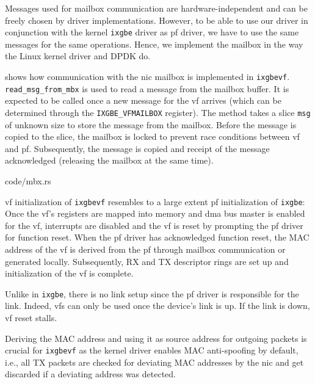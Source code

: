 Messages used for mailbox communication are hardware-independent and can be
freely chosen by driver implementations. However, to be able to use our driver
in conjunction with the kernel \texttt{ixgbe} driver as \ac{pf} driver, we have
to use the same messages for the same operations. Hence, we implement the
mailbox in the way the Linux kernel driver and DPDK do.

 shows how communication with the \ac{nic} mailbox is implemented
in \texttt{ixgbevf}. \linebreak \texttt{read\_msg\_from\_mbx} is used to read a
message from the mailbox buffer. It is expected to be called once a new message
for the \ac{vf} arrives (which can be determined through the
\texttt{IXGBE\_VFMAILBOX} register). The method takes a slice \texttt{msg} of
unknown size to store the message from the mailbox. Before the message is copied
to the slice, the mailbox is locked to prevent race conditions between \ac{vf}
and \ac{pf}. Subsequently, the message is copied and receipt of the message
acknowledged (releasing the mailbox at the same time).

\begin{minipage}{\textwidth}
     {code/mbx.rs}
\end{minipage}

\ac{vf} initialization of \texttt{ixgbevf} resembles to a large extent \ac{pf}
initialization of \texttt{ixgbe}: Once the \ac{vf}'s registers are mapped into
memory and \ac{dma} bus master is enabled for the \ac{vf}, interrupts are
disabled and the \ac{vf} is reset by prompting the \ac{pf} driver for function
reset. When the \ac{pf} driver has acknowledged function reset, the MAC address
of the \ac{vf} is derived from the \ac{pf} through mailbox communication or
generated locally. Subsequently, RX and TX descriptor rings are set up and
initialization of the \ac{vf} is complete.

Unlike in \texttt{ixgbe}, there is no link setup since the \ac{pf} driver is
responsible for the link. Indeed, \acp{vf} can only be used once the device's
link is up. If the link is down, \ac{vf} reset stalls.

Deriving the MAC address and using it as source address for outgoing packets is
crucial for \texttt{ixgbevf} as the kernel driver enables MAC anti-spoofing by
default, i.e., all TX packets are checked for deviating MAC addresses by the
\ac{nic} and get discarded if a deviating address was detected.


